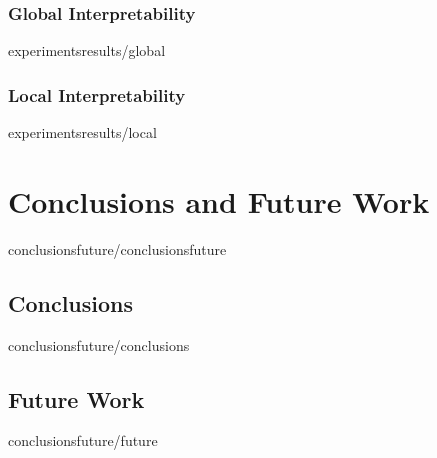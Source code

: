 \documentclass[covers, firstnumbered, tfg, extendedindex, epsbased, english, final]{tfgtfmthesisuam}
\begin{document}
\subsection{Global Interpretability}{experimentsresults/global}
\subsection{Local Interpretability}{experimentsresults/local}

\chapter{Conclusions and Future Work}{conclusionsfuture/conclusionsfuture}
\section{Conclusions}{conclusionsfuture/conclusions}
\section{Future Work}{conclusionsfuture/future}


\appendix
\end{document}
